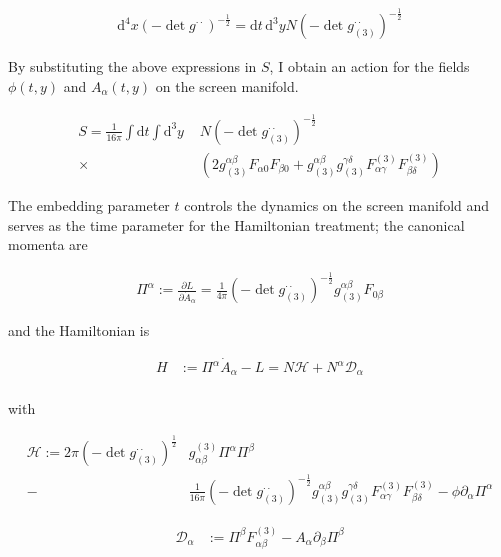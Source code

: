 \documentclass[11pt]{article}
\begin{document}
\begin{align}
	\mathrm{d}^4 x \left( - \det{g^{\cdot \cdot}} \right)^{-\frac{1}{2}} = \mathrm{d}t \, \mathrm{d}^3 y N \left( - \det{g_{(3)}^{\cdot \cdot}} \right)^{-\frac{1}{2}}
\end{align}
 
By substituting the above expressions in $S$, I obtain an action for the fields $\phi (t, y) $ and $A_{\alpha} (t, y) $ on the screen manifold. 

\begin{align}
	S = \frac{1}{16 \pi} \int \mathrm{d}t \int \mathrm{d}^3 y \, \,
	&N \left( - \det{g_{(3)}^{\cdot \cdot}} \right)^{-\frac{1}{2}} \\ 
	\times 
	&\left(
	 2 g_{(3)}^{\alpha \beta} F_{\alpha 0 } F_{\beta 0 }  
	 + g_{(3)}^{\alpha \beta} g_{(3)}^{\gamma \delta } F^{(3)}_{\alpha \gamma}  F^{(3)}_{\beta \delta} 
	\right)
\end{align}

The embedding parameter $t$ controls the dynamics on the screen manifold and serves as the time parameter for the Hamiltonian treatment; the canonical momenta are 

\begin{align}
	\Pi^{\alpha} := \frac{\partial L}{\partial \dot{A}_{\alpha}} = \frac{1}{4\pi} \left( - \det{g_{(3)}^{\cdot \cdot}} \right)^{-\frac{1}{2}} 
	 g_{(3)}^{\alpha \beta} F_{0 \beta}
\end{align}

and the Hamiltonian is

\begin{align}
	H &:= \Pi^{\alpha} \dot{A}_{\alpha} - L = N \mathcal{H} + N^\alpha \mathcal{D}_{\alpha}\\
\end{align}

with 

\begin{equation}
\begin{split}
	\mathcal{H} :=  
	2 \pi \left( - \det{g_{(3)}^{\cdot \cdot}} \right)^{\frac{1}{2}} 
	& g_{\alpha \beta}^{(3)} \Pi^{\alpha} \Pi^{\beta} \\
	 - &\frac{1}{16 \pi} \left( - \det{g_{(3)}^{\cdot \cdot}} \right)^{- \frac{1}{2}} g_{(3)}^{\alpha \beta} g_{(3)}^{\gamma \delta } F^{(3)}_{\alpha \gamma}  F^{(3)}_{\beta \delta} 
	- \phi \partial_{\alpha} \Pi^{\alpha} 
\end{split}
\end{equation}

\begin{align}
	\mathcal{D}_{\alpha} &:= \Pi^{\beta} F^{(3)}_{\alpha \beta} -  A_{\alpha} 
	\partial_{\beta} \Pi^{\beta}
\end{align}
\end{document}
